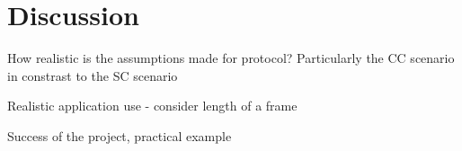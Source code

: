 \chapter{Discussion}
How realistic is the assumptions made for protocol? Particularly the CC scenario in constrast to the SC scenario

Realistic application use - consider length of a frame

Success of the project, practical example